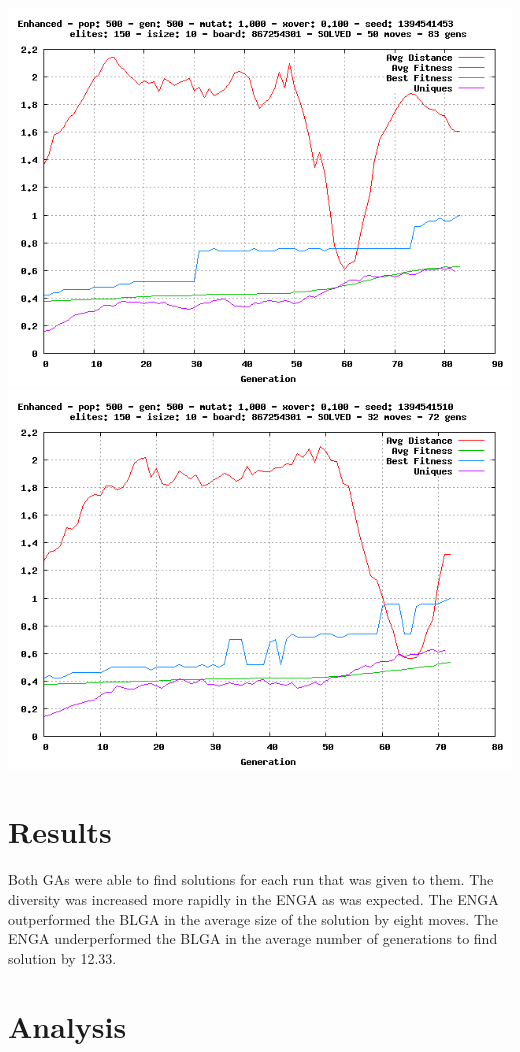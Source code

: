 \documentclass[]{article}
\begin{document}
\includegraphics{img/5.png} \includegraphics{img/6.png}

\section{Results}\label{results}

Both GAs were able to find solutions for each run that was given to
them. The diversity was increased more rapidly in the ENGA as was
expected. The ENGA outperformed the BLGA in the average size of the
solution by eight moves. The ENGA underperformed the BLGA in the average
number of generations to find solution by 12.33.

\section{Analysis}\label{analysis}
\end{document}
